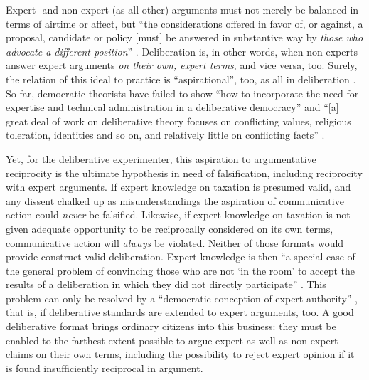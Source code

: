 Expert- and non-expert (as all other) arguments must not merely be balanced in terms of airtime or affect, but ``the considerations offered in favor of, or against, a proposal, candidate or policy [must] be answered in substantive way by \emph{those who advocate a different position}'' \citep[K550, emphasis added]{Fishkin2009}.
Deliberation is, in other words, when non-experts answer expert arguments \emph{on their own, expert terms}, and vice versa, too.
Surely, the relation of this ideal to practice is ``aspirational'', too, as all in deliberation \citep[K2679]{Fishkin2009}.
So far, democratic theorists have failed to show ``how to incorporate the need for expertise and technical administration in a deliberative democracy'' \citep[515]{Thompson2008} and ``[a] great deal of work on deliberative theory focuses on conflicting values, religious toleration, identities and so on, and relatively little on conflicting facts'' \citep[2]{Moore2011}.

Yet, for the deliberative experimenter, this aspiration to argumentative reciprocity is the ultimate hypothesis in need of  falsification, including reciprocity with expert arguments.
If expert knowledge on taxation is presumed valid, and any dissent chalked up as misunderstandings the aspiration of communicative action could \emph{never} be falsified.
Likewise, if expert knowledge on taxation is not given adequate opportunity to be reciprocally considered on its own terms, communicative action will \emph{always} be violated.
Neither of those formats would provide construct-valid deliberation.
Expert knowledge is then ``a special case of the general problem of convincing those who are not `in the room' to accept the results of a deliberation in which they did not directly participate'' \citep[2]{Moore2011}.
This problem can only be resolved by a ``democratic conception of expert authority'' \cite[2]{Moore2011}, that is, if deliberative standards are extended to expert arguments, too.
A good deliberative format brings ordinary citizens into this business:
they must be enabled to the farthest extent possible to argue expert as well as non-expert claims on their own terms, including the possibility to reject expert opinion if it is found insufficiently reciprocal in argument.


